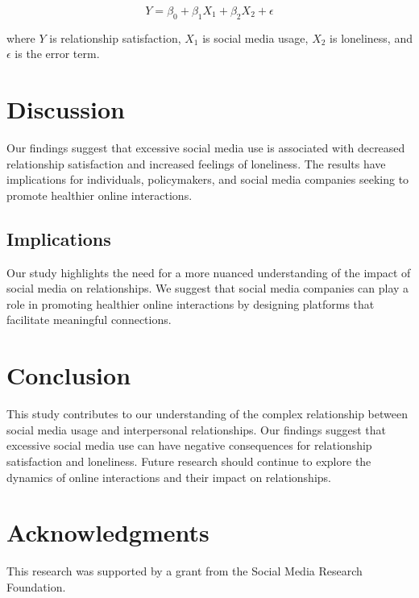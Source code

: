 \documentclass[12pt,a4paper]{article}
\begin{document}
$$Y = \beta_0 + \beta_1X_1 + \beta_2X_2 + \epsilon$$

where $Y$ is relationship satisfaction, $X_1$ is social media usage, $X_2$ is loneliness, and $\epsilon$ is the error term.

\section{Discussion}
Our findings suggest that excessive social media use is associated with decreased relationship satisfaction and increased feelings of loneliness. The results have implications for individuals, policymakers, and social media companies seeking to promote healthier online interactions.

\subsection{Implications}
Our study highlights the need for a more nuanced understanding of the impact of social media on relationships. We suggest that social media companies can play a role in promoting healthier online interactions by designing platforms that facilitate meaningful connections.

\section{Conclusion}
This study contributes to our understanding of the complex relationship between social media usage and interpersonal relationships. Our findings suggest that excessive social media use can have negative consequences for relationship satisfaction and loneliness. Future research should continue to explore the dynamics of online interactions and their impact on relationships.

\section*{Acknowledgments}
This research was supported by a grant from the Social Media Research Foundation.
\end{document}
